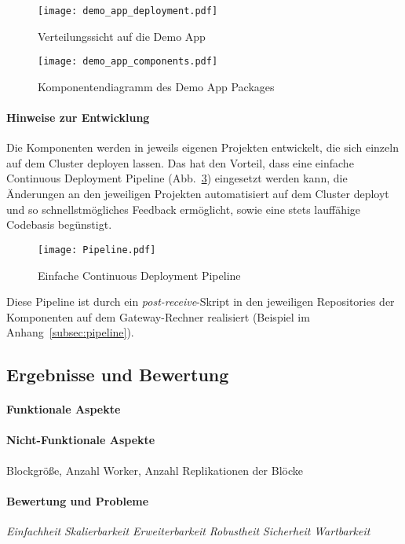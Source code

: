 \begin{figure}[ht!]
	\centering
  \texttt{[image: demo\_app\_deployment.pdf]}
	\caption{Verteilungssicht auf die Demo App}
	\label{figure:demo_app_verteilung}
\end{figure}


\begin{figure}[ht!]
	\centering
  \texttt{[image: demo\_app\_components.pdf]}
	\caption{Komponentendiagramm des Demo App Packages}
	\label{figure:demo_app_komponenten}
\end{figure}

\paragraph{Hinweise zur Entwicklung}
Die Komponenten werden in jeweils eigenen Projekten entwickelt, die sich einzeln auf dem Cluster deployen lassen. Das hat den Vorteil, dass eine einfache Continuous Deployment Pipeline (Abb.~\ref{figure:cd_pipeline}) eingesetzt werden kann, die Änderungen an den jeweiligen Projekten automatisiert auf dem Cluster deployt und so schnellstmögliches Feedback ermöglicht, sowie eine stets lauffähige Codebasis begünstigt.\\

\begin{figure}[ht!]
	\centering
  \texttt{[image: Pipeline.pdf]}
	\caption{Einfache Continuous Deployment Pipeline}
	\label{figure:cd_pipeline}
\end{figure}

Diese Pipeline ist durch ein \textit{post-receive}-Skript in den jeweiligen Repositories der Komponenten auf dem Gateway-Rechner realisiert (Beispiel im Anhang~\ref{subsec:pipeline}).\\

\subsection{Ergebnisse und Bewertung}
\paragraph{Funktionale Aspekte}
\paragraph{Nicht-Funktionale Aspekte}
Blockgröße, Anzahl Worker, Anzahl Replikationen der Blöcke
\paragraph{Bewertung und Probleme}

\textit{Einfachheit}
\textit{Skalierbarkeit}
\textit{Erweiterbarkeit}
\textit{Robustheit}
\textit{Sicherheit}
\textit{Wartbarkeit}
